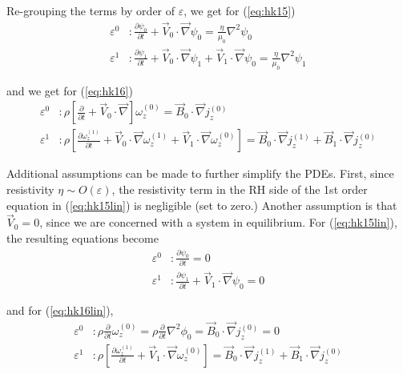 \documentclass{article}
\begin{document}
Re-grouping the terms by order of $\varepsilon$, we get for (\ref{eq:hk15})
\begin{equation}
    \label{eq:hk15lin}
    \begin{split}
        \varepsilon^0 &: \frac{\partial \psi_0}{\partial t} + \vec{V}_0 \cdot \vec{\nabla} \psi_0 = \frac{\eta}{\mu_0}\nabla ^{2}\psi_0 \\
        \varepsilon^1 &: \frac{\partial \psi_1}{\partial t} + \vec{V}_0 \cdot \vec{\nabla} \psi_1 + \vec{V}_1 \cdot \vec{\nabla} \psi_0 = \frac{\eta}{\mu_0}\nabla ^{2}\psi_1
    \end{split}
\end{equation}

and we get for (\ref{eq:hk16})
\begin{equation}
    \label{eq:hk16lin}
    \begin{split}
        \varepsilon^0 &: \rho\left[ \frac{\partial}{\partial t} + \vec{V}_0 \cdot \vec{\nabla} \right] \omega_z^{(0)} = \vec{B}_0 \cdot \vec{\nabla}j_z^{(0)} \\
        \varepsilon^1 &: \rho\left[\frac{\partial \omega_z^{(1)}}{\partial t} + \vec{V}_0 \cdot \vec{\nabla}\omega_z^{(1)} + \vec{V}_1 \cdot \vec{\nabla}\omega_z^{(0)}\right] = \vec{B}_0 \cdot \vec{\nabla}j_z^{(1)} + \vec{B}_1 \cdot \vec{\nabla}j_z^{(0)}
    \end{split}
\end{equation} 

Additional assumptions can be made to further simplify the PDEs. First, since resistivity $\eta\sim O(\varepsilon)$, the resistivity term in the RH side of the 1st order equation in (\ref{eq:hk15lin}) is negligible (set to zero.)
Another assumption is that $\vec{V}_0=0$, since we are concerned with a system in equilibrium. For (\ref{eq:hk15lin}), the resulting equations become
\begin{equation}
    \label{eq:hk15lin2}
    \begin{split}
        \varepsilon^0 &: \frac{\partial \psi_0}{\partial t} = 0 \\
        \varepsilon^1 &: \frac{\partial \psi_1}{\partial t} + \vec{V}_1 \cdot \vec{\nabla} \psi_0 = 0
    \end{split}
\end{equation} 

and for (\ref{eq:hk16lin}),
\begin{equation}
    \label{eq:hk15lin2}
    \begin{split}
        \varepsilon^0 &: \rho\frac{\partial}{\partial t}\omega_z^{(0)} = \rho\frac{\partial}{\partial t}\nabla ^{2} \phi_0 = \vec{B}_0 \cdot \vec{\nabla}j_z^{(0)} = 0 \\ 
        \varepsilon^1 &: \rho\left[\frac{\partial \omega_z^{(1)}}{\partial t} + \vec{V}_1 \cdot \vec{\nabla}\omega_z^{(0)}\right] = \vec{B}_0 \cdot \vec{\nabla}j_z^{(1)} + \vec{B}_1 \cdot \vec{\nabla}j_z^{(0)}
    \end{split}
\end{equation} 
\end{document}

